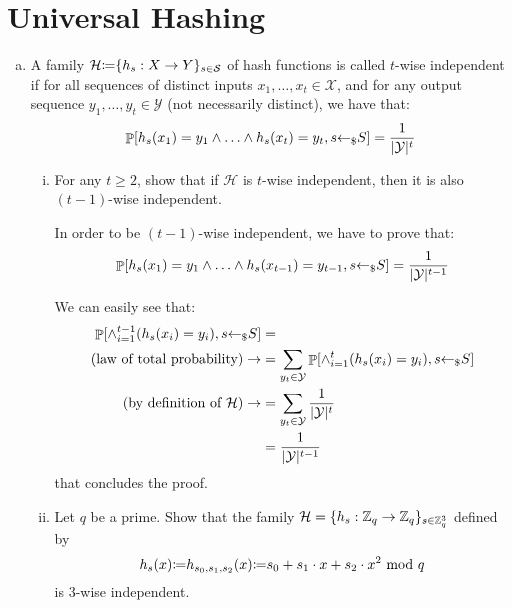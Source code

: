 \section{Universal Hashing}
\begin{enumerate}[(a)]
	\item A family $\mathcal{H} {\coloneqq} \{h_s: X \to Y\}_{s \in \mathcal{S}}$ of hash functions is called $t$-wise independent if for all sequences of distinct inputs $x_1, \dots, x_t \in \mathcal{X}$, and for any output sequence $y_1, \dots, y_t \in \mathcal{Y}$ (not necessarily distinct), we have that:
	      \[ \P[h_s(x_1) = y_1 \and \dots \and h_s(x_t) = y_t, s \ud S] = \frac{1}{|\mathcal{Y}|^t} \]
	      \begin{enumerate}[(i)]
		      \item For any $t \ge 2$, show that if $\mathcal{H}$ is $t$-wise independent, then it is also $(t-1)$-wise independent.

		            \begin{solution}
			            In order to be $(t-1)$-wise independent, we have to prove that:
			            \[ \P[h_s(x_1) = y_1 \and \dots \and h_s(x_{t-1}) = y_{t-1}, s \ud S] = \frac{1}{|\mathcal{Y}|^{t-1}} \]

			            We can easily see that:
			            \begin{align*}
				            \mathop{\mathbb P}[\wedge_{i=1}^{t-1} (h_s(x_i) = y_i), s {\leftarrow_\$} S ]     & =                                                                         \\
				            \mbox{(law of total probability)} \rightarrow       & = \sum_{y_t \in \mathcal{Y}} \mathop{\mathbb P}[\wedge_{i=1}^{t} (h_s(x_i) = y_i), s {\leftarrow_\$} S] \\
				            \mbox{(by definition of $\mathcal{H}$)} \rightarrow & = \sum_{y_t \in \mathcal{Y}} \frac{1}{|\mathcal{Y}|^t}                    \\
				                                                                & = \frac{1}{|\mathcal{Y}|^{t-1}}
			            \end{align*}
			            that concludes the proof.
		            \end{solution}

		      \item Let $q$ be a prime. Show that the family $\mathcal{H} = \{h_s:{\mathbb Z}_q \to {\mathbb Z}_q \}_{s \in {\mathbb Z}_q^3}$ defined by
		            \[ h_s(x) {\coloneqq} h_{s_0,s_1,s_2}(x) {\coloneqq} s_0 + s_1 \cdot x + s_2 \cdot x^2 \mbox{ mod } q \]
		            is 3-wise independent.


\end{enumerate}
\end{enumerate}

